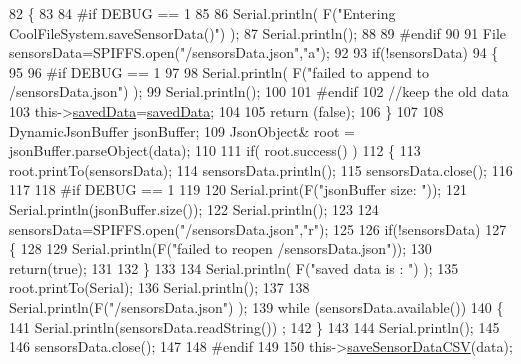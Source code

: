 \begin{DoxyCode}
82 \{
83 
84 \textcolor{preprocessor}{#if DEBUG == 1}
85 
86     Serial.println( F(\textcolor{stringliteral}{"Entering CoolFileSystem.saveSensorData()"}) );
87     Serial.println();
88 
89 \textcolor{preprocessor}{#endif}
90     
91     File sensorsData=SPIFFS.open(\textcolor{stringliteral}{"/sensorsData.json"},\textcolor{stringliteral}{"a"});
92 
93     \textcolor{keywordflow}{if}(!sensorsData)
94     \{
95     
96 \textcolor{preprocessor}{    #if DEBUG == 1}
97     
98         Serial.println( F(\textcolor{stringliteral}{"failed to append to /sensorsData.json"}) );
99         Serial.println();
100     
101 \textcolor{preprocessor}{    #endif}
102         \textcolor{comment}{//keep the old data}
103         this->\hyperlink{class_cool_file_system_ad9f5b739a32100f5f21270c3d9ee2b1d}{savedData}=\hyperlink{class_cool_file_system_ad9f5b739a32100f5f21270c3d9ee2b1d}{savedData};
104 
105         \textcolor{keywordflow}{return} (\textcolor{keyword}{false}); 
106     \}   
107 
108     DynamicJsonBuffer jsonBuffer;
109     JsonObject& root = jsonBuffer.parseObject(data);
110 
111     \textcolor{keywordflow}{if}( root.success() )
112     \{
113         root.printTo(sensorsData);
114         sensorsData.println();
115         sensorsData.close();
116 
117 
118 \textcolor{preprocessor}{    #if DEBUG == 1}
119         
120         Serial.print(F(\textcolor{stringliteral}{"jsonBuffer size: "}));
121         Serial.println(jsonBuffer.size());
122         Serial.println();
123 
124         sensorsData=SPIFFS.open(\textcolor{stringliteral}{"/sensorsData.json"},\textcolor{stringliteral}{"r"});
125         
126         \textcolor{keywordflow}{if}(!sensorsData)
127         \{
128             
129             Serial.println(F(\textcolor{stringliteral}{"failed to reopen /sensorsData.json"}));
130             \textcolor{keywordflow}{return}(\textcolor{keyword}{true});
131                         
132         \}
133     
134         Serial.println( F(\textcolor{stringliteral}{"saved data is : "}) );
135         root.printTo(Serial);
136         Serial.println();
137 
138         Serial.println(F(\textcolor{stringliteral}{"/sensorsData.json"}) );
139         \textcolor{keywordflow}{while} (sensorsData.available()) 
140         \{
141             Serial.println(sensorsData.readString()) ;
142         \}
143         
144         Serial.println();
145         
146         sensorsData.close();
147     
148 \textcolor{preprocessor}{    #endif}
149 
150         this->\hyperlink{class_cool_file_system_ab78704d5d21ce10fc6f1138ab5ab46c8}{saveSensorDataCSV}(data);     

\end{DoxyCode}
